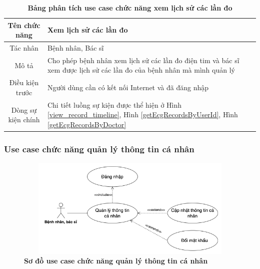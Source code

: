   \begin{table}[H]
    \caption{\bfseries \fontsize{12pt}{0pt}\selectfont Bảng phân tích use case chức năng xem lịch sử các lần đo}
    \centering
    \begin{tabularx}{0.9\textwidth}{|c|X|}
      \hline
      \textbf{Tên chức năng} & \textbf{Xem lịch sử các lần đo} \\
      \hline
      Tác nhân & Bệnh nhân, Bác sĩ \\
      \hline
      Mô tả & Cho phép bệnh nhân xem lịch sử các lần đo điện tim và bác sĩ xem được lịch sử các lần đo của bệnh nhân
      mà mình quản lý \\
      \hline
      Điều kiện trước & Người dùng cần có kết nối Internet và đã đăng nhập \\
      \hline
      Dòng sự kiện chính & 
        Chi tiết luồng sự kiện được thể hiện ở Hình \ref{view_record_timeline}, Hình \ref{getEcgRecordsByUserId}, Hình \ref{getEcgRecordsByDoctor} 
        \\
      \hline
    \end{tabularx}
  \end{table}

\subsubsection{Use case chức năng quản lý thông tin cá nhân}
  \begin{figure}[H]
    \centering
    \includegraphics[width=12cm,height=4.8cm]{Images/use_case/use_case_manage_info.png}
    \caption[Sơ đồ use case chức năng quản lý thông tin cá nhân]{\bfseries \fontsize{12pt}{0pt}
    \selectfont Sơ đồ use case chức năng quản lý thông tin cá nhân}
    \label{use_case_manage_info} %
  \end{figure}

